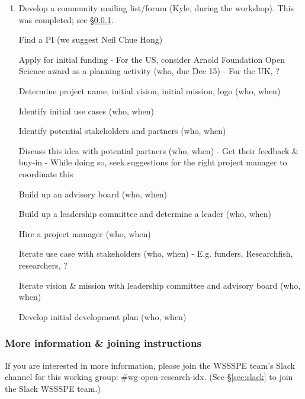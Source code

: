 \begin{enumerate}
\item Develop a community mailing list/forum (Kyle, during the workshop).  This was completed; see \S\ref{sec:wg-open-research-index-list}.

Find a PI (we suggest Neil Chue Hong)

Apply for initial funding
- For the US, consider Arnold Foundation Open Science award as a planning activity (who, due Dec 15)
- For the UK, ?

Determine project name, initial vision, initial mission, logo (who, when)

Identify initial use cases (who, when)

Identify potential stakeholders and partners (who, when)

Discuss this idea with potential partners (who, when)
- Get their feedback \& buy-in
- While doing so, seek suggestions for the right project manager to coordinate this

Build up an advisory board (who, when)

Build up a leadership committee and determine a leader (who, when)

Hire a project manager (who, when)

Iterate use case with stakeholders (who, when)
- E.g. funders, Researchfish, researchers, ?

Iterate vision \& mission with leadership committee and advisory board (who, when)

Develop initial development plan (who, when)

\end{enumerate}


\subsubsection{More information \& joining instructions}\label{sec:wg-open-research-index-list}

If you are interested in more information, please join the WSSSPE team's Slack channel for this working group: \#wg-open-research-idx.  (See \S\ref{sec:slack} to join the Slack WSSSPE team.)